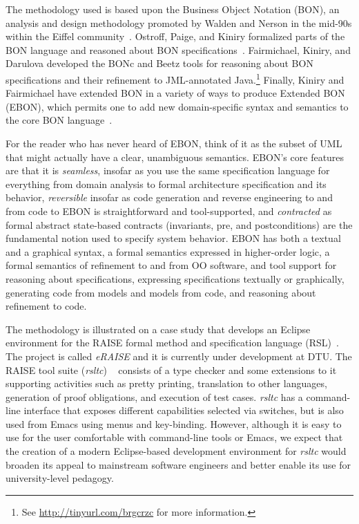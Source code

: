 \documentclass[letterpaper,conference]{IEEEtran}
\begin{document}
The methodology used is based upon the Business Object Notation (BON),
an analysis and design methodology promoted by Walden and Nerson in
the mid-90s within the Eiffel community~\cite{WaldenNerson95}.
Ostroff, Paige, and Kiniry formalized parts of the BON language and
reasoned about BON
specifications~\cite{LancaricOstroffPaige02,EBON01,PaigeEtal02,PaigeOstroff01b}.
Fairmichael, Kiniry, and Darulova developed the BONc and Beetz tools
for reasoning about BON specifications and their refinement to
JML-annotated Java.\footnote{See \url{http://tinyurl.com/brgcrzc} for
  more information.}  Finally, Kiniry and Fairmichael have extended
BON in a variety of ways to produce Extended BON (EBON), which permits
one to add new domain-specific syntax and semantics to the core BON
language~\cite{Kiniry02-PhDThesis}.

For the reader who has never heard of EBON, think of it as the subset
of UML that might actually have a clear, unambiguous semantics.
EBON's core features are that it is \emph{seamless}, insofar as you
use the same specification language for everything from domain
analysis to formal architecture specification and its behavior,
\emph{reversible} insofar as code generation and reverse engineering
to and from code to EBON is straightforward and tool-supported, and
\emph{contracted} as formal abstract state-based contracts
(invariants, pre, and postconditions) are the fundamental notion used
to specify system behavior.  EBON has both a textual and a graphical
syntax, a formal semantics expressed in higher-order logic, a formal
semantics of refinement to and from OO software, and tool support for
reasoning about specifications, expressing specifications textually or
graphically, generating code from models and models from code, and
reasoning about refinement to code.

The methodology is illustrated on a case study that develops an
Eclipse environment for the RAISE formal method %
and specification language (RSL)~\cite{RLG92}. The project is called
\emph{eRAISE} and it is currently under development at DTU.
The RAISE tool suite (\emph{rsltc}) ~\cite{rsltcUserGuide,RAISETools2003}
consists of a type checker and some extensions to it supporting
activities such as pretty printing, %
translation to other languages, generation of proof obligations,
and execution of test cases.
\emph{rsltc} has a command-line interface that exposes different
capabilities selected via switches, but is also used from Emacs using
menus and key-binding. However, although it is easy to use for the
user comfortable with command-line tools or Emacs, we expect that the
creation of a modern Eclipse-based development environment for
\emph{rsltc} would broaden its appeal to mainstream software engineers
and better enable its use for university-level pedagogy.
\end{document}
